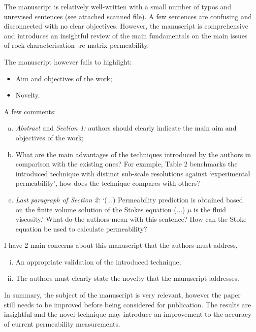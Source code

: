 \documentclass[14pt,twoside]{report}
\begin{document}
The manuscript is relatively well-written with a small number of typos and unrevised sentences (see attached scanned file). A few sentences are confusing and disconnected with no clear objectives. However, the manuscript is comprehensive and introduces an insightful review of the main fundamentals on the main issues of rock characterisation -re matrix permeability.

The manuscript however fails to highlight:
  \begin{itemize}
    \item Aim and objectives of the work;
    \item Novelty.
  \end{itemize}
A few comments:
\begin{enumerate}[(a)] 
%
\item {\it Abstract} and {\it Section 1:} authors should clearly indicate the main aim and objectives of the work;
%
\item What are the main advantages of the techniques introduced by the authors in comparison with the existing ones? For example, Table 2 benchmarks the introduced technique with distinct sub-scale resolutions against `experimental permeability', how does the technique compares with others?  
%
\item {\it Last paragraph of Section 2:} `(...) Permeability prediction is obtained based on the finite volume solution of the Stokes equation (...) $\mu$ is the fluid viscosity.' What do the authors mean with this sentence? How can the Stoke equation be used to calculate permeability?
%
\end{enumerate}
% 
I have 2 main concerns about this manuscript that the authors must address,
\begin{enumerate}[(i)]
\item An appropriate validation of the introduced technique;
\item The authors must clearly state the novelty that the manuscript addresses.
\end{enumerate}

In summary, the subject of the manuscript is very relevant, however the paper still needs to be improved before being considered for publication. The results are insightful and the novel technique may introduce an improvement to the  accuracy of current permeability measurements. 


{
  } 
\end{document}
